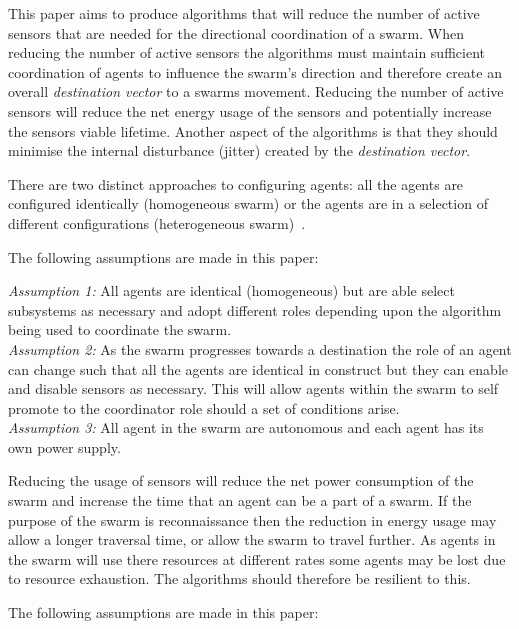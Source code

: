 \documentclass{ieeeaccess}
\begin{document}
This paper aims to produce algorithms that will reduce the number of active sensors that are needed for the directional coordination of a swarm. When reducing the number of active sensors the algorithms must maintain sufficient coordination of agents to influence the swarm's direction and therefore create an overall \textit{destination vector} to a swarms movement. Reducing the number of active sensors will reduce the net energy usage of the sensors and potentially increase the sensors viable lifetime. Another aspect of the algorithms is that they should minimise the internal disturbance (jitter) created by the \textit{destination vector}.

There are two distinct approaches to configuring agents: all the agents are configured identically (homogeneous swarm) or the agents are in a selection of different configurations (heterogeneous swarm)~\cite{BS:13}. 

The following assumptions are made in this paper:

\textit{Assumption 1:} All agents are identical (homogeneous) but are able select subsystems as necessary and adopt different roles depending upon the algorithm being used to coordinate the swarm. \\
\textit{Assumption 2:} As the swarm progresses towards a destination the role of an agent can change such that all the agents are identical in construct but they can enable and disable sensors as necessary. This will allow agents within the swarm to self promote to the coordinator role should a set of conditions arise.\\
\textit{Assumption 3:} All agent in the swarm are autonomous and each agent has its own power supply. 

Reducing the usage of sensors will reduce the net power consumption of the swarm and increase the time that an agent can be a part of a swarm. If the purpose of the swarm is reconnaissance then the reduction in energy usage may allow a longer traversal time, or allow the swarm to travel further. As agents in the swarm will use there resources at different rates some agents may be lost due to resource exhaustion. The algorithms should therefore be resilient to this.

The following assumptions are made in this paper:
\end{document}
